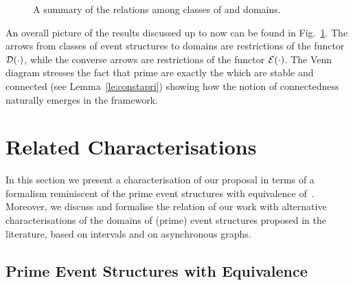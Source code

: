\begin{figure}
{
}


\caption{A summary of the relations among classes of {\esabbr} and domains.}
\label{fi:summary}
\end{figure}
 
An overall picture of the results discussed up to now can be found in Fig.~\ref{fi:summary}. The arrows from classes of event structures to domains are restrictions of the functor $\mathcal{D}({\cdot})$, while the converse arrows are restrictions of the functor  $\mathcal{E}({\cdot})$. The Venn diagram stresses the fact that prime {\esabbr} are exactly the {\esabbr} which are stable and connected (see Lemma~\ref{le:constapri}) showing how the notion of connectedness naturally emerges in the framework.




\section{Related Characterisations}
\label{se:characterisations}

In this section we present a characterisation of our proposal in terms
of a formalism reminiscent of the prime event structures with
equivalence of~\cite{win2017,VismeW19}. Moreover, we discuss and
formalise the relation of our work with alternative characterisations
of the domains of (prime) event structures proposed in the literature,
based on intervals and on asynchronous graphs.


\subsection{Prime Event Structures with Equivalence}
\label{ss:pes-equiv}

